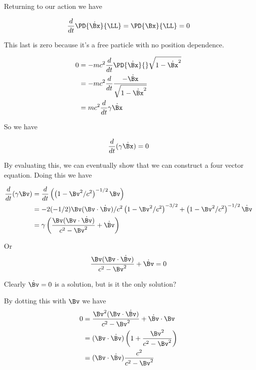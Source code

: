 Returning to our action we have

\begin{equation}\label{eqn:relativisticElectrodynamicsL7:240}
\frac{d}{dt} \PD{\dot{\Bx}}{\LL} = \PD{\Bx}{\LL} = 0
\end{equation}

This last is zero because it's a free particle with no position dependence.

\begin{align*}
0 
&= -m c^2 \frac{d}{dt} \PD{\dot{\Bx}}{} \sqrt{ 1 - \dot{\Bx}^2 } \\
&= -m c^2 \frac{d}{dt} \frac{- \dot{\Bx}}{\sqrt{ 1 - \dot{\Bx}^2 } } \\
&= m c^2 \frac{d}{dt} \gamma \dot\Bx
\end{align*}

So we have

\begin{equation}\label{eqn:relativisticElectrodynamicsL7:241}
\frac{d}{dt} (\gamma \dot{\Bx}) = 0
\end{equation}

By evaluating this, we can eventually show that we can construct a four vector equation.  Doing this we have

\begin{align*}
\frac{d}{dt} (\gamma \Bv) 
&=
\frac{d}{dt} \left( \left(1 - \Bv^2/c^2\right)^{-1/2} \Bv \right) \\
&=
-2 (-1/2) \Bv (\Bv \cdot \dot{\Bv})/c^2 \left(1 - \Bv^2/c^2\right)^{-3/2} + \left(1 - \Bv^2/c^2\right)^{-1/2} \dot{\Bv} \\
&=
\gamma \left( \frac{\Bv (\Bv \cdot \dot{\Bv}) }{ c^2 - \Bv^2 } + \dot{\Bv} \right)
\end{align*}

Or
\begin{equation}\label{eqn:relativisticElectrodynamicsL7:242}
\frac{\Bv (\Bv \cdot \dot{\Bv}) }{ c^2 - \Bv^2 } + \dot{\Bv} = 0
\end{equation}

Clearly $\dot{\Bv} = 0$ is a solution, but is it the only solution?

By dotting this with $\Bv$ we have
\begin{align*}
0 
&= \frac{\Bv^2 (\Bv \cdot \dot{\Bv}) }{ c^2 - \Bv^2 } + \dot{\Bv} \cdot \Bv  \\
&= (\Bv \cdot \dot{\Bv}) \left( 1 + \frac{\Bv^2}{c^2 - \Bv^2} \right) \\
&= (\Bv \cdot \dot{\Bv}) \frac{c^2}{c^2 - \Bv^2} 
\end{align*}

